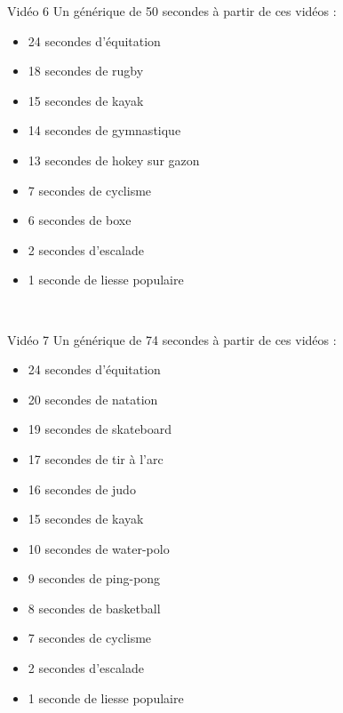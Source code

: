 \documentclass[10pt, a5paper,twoside]{article}
\begin{document}
\vfill

\begin{card}[width = \textwidth, colback = olympicblue, colframe = olympicblue, bottomtitle = 2mm]{Vidéo 6}
  Un générique de 50 secondes à partir de ces vidéos :
  \vspace{-1mm}\begin{itemize}
    \item 24 secondes d'équitation
    \item 18 secondes de rugby
    \item 15 secondes de kayak
    \item 14 secondes de gymnastique
    \item 13 secondes de hokey sur gazon
    \item 7 secondes de cyclisme
    \item 6 secondes de boxe
    \item 2 secondes d'escalade
    \item 1 seconde de liesse populaire
  \end{itemize}
\end{card}

\vfill

\clearpage
~
\vfill

\begin{card}[width = \textwidth, colback = olympicblue, colframe = olympicblue, bottomtitle = 2mm]{Vidéo 7}
  Un générique de 74 secondes à partir de ces vidéos :
  \vspace{-1mm}\begin{itemize}
    \item 24 secondes d'équitation
    \item 20 secondes de natation
    \item 19 secondes de skateboard
    \item 17 secondes de tir à l'arc
    \item 16 secondes de judo
    \item 15 secondes de kayak
    \item 10 secondes de water-polo
    \item 9 secondes de ping-pong
    \item 8 secondes de basketball
    \item 7 secondes de cyclisme
    \item 2 secondes d'escalade
    \item 1 seconde de liesse populaire
  \end{itemize}
\end{card}
\end{document}
